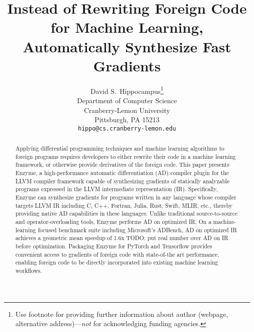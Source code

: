 \documentclass{article}
\title{Instead of Rewriting Foreign Code for Machine Learning, Automatically Synthesize Fast Gradients}
\author{%
  David S.~Hippocampus\thanks{Use footnote for providing further information
    about author (webpage, alternative address)---\emph{not} for acknowledging
    funding agencies.} \\
  Department of Computer Science\\
  Cranberry-Lemon University\\
  Pittsburgh, PA 15213 \\
  \texttt{hippo@cs.cranberry-lemon.edu} \\
}
\newcommand{\todo}[1]{{\color{red} TODO: #1}}
\begin{document}
\maketitle


\begin{abstract}
Applying differential programming techniques and machine learning algorithms to foreign programs requires developers to either rewrite their code in a machine learning framework, or otherwise provide derivatives of the foreign code.
This paper presents Enzyme, a high-performance automatic differentiation (AD) compiler plugin for the LLVM compiler framework capable of synthesizing gradients of statically analyzable programs expressed in the LLVM intermediate representation (IR). Specifically, Enzyme can synthesize gradients for programs written in any language whose compiler targets LLVM IR including C, C++, Fortran, Julia, Rust, Swift, MLIR, etc., thereby providing native AD capabilities in these languages. Unlike traditional source-to-source and operator-overloading tools, Enzyme performs AD on optimized IR. On a machine-learning focused benchmark suite including Microsoft's ADBench, AD on optimized IR achieves a geometric mean speedup of 1.6x\todo{put real number} over AD on IR before optimization. Packaging Enzyme for PyTorch and Tensorflow provides convenient access to gradients of foreign code with state-of-the art performance, enabling foreign code to be directly incorporated into existing machine learning workflows. 
\end{abstract}










\end{document}
